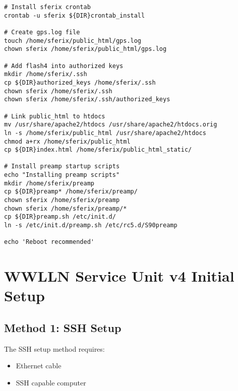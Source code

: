 \begin{verbatim}
# Install sferix crontab
crontab -u sferix ${DIR}crontab_install

# Create gps.log file
touch /home/sferix/public_html/gps.log
chown sferix /home/sferix/public_html/gps.log

# Add flash4 into authorized keys
mkdir /home/sferix/.ssh
cp ${DIR}authorized_keys /home/sferix/.ssh
chown sferix /home/sferix/.ssh
chown sferix /home/sferix/.ssh/authorized_keys

# Link public_html to htdocs
mv /usr/share/apache2/htdocs /usr/share/apache2/htdocs.orig
ln -s /home/sferix/public_html /usr/share/apache2/htdocs
chmod a+rx /home/sferix/public_html
cp ${DIR}index.html /home/sferix/public_html_static/

# Install preamp startup scripts
echo "Installing preamp scripts"
mkdir /home/sferix/preamp
cp ${DIR}preamp* /home/sferix/preamp/
chown sferix /home/sferix/preamp
chown sferix /home/sferix/preamp/*
cp ${DIR}preamp.sh /etc/init.d/
ln -s /etc/init.d/preamp.sh /etc/rc5.d/S90preamp

echo 'Reboot recommended'

\end{verbatim}

\section{WWLLN Service Unit v4 Initial Setup}

\subsection*{Method 1: SSH Setup}
The SSH setup method requires:
\begin{itemize}
\item{Ethernet cable}
\item{SSH capable computer}
\end{itemize}

